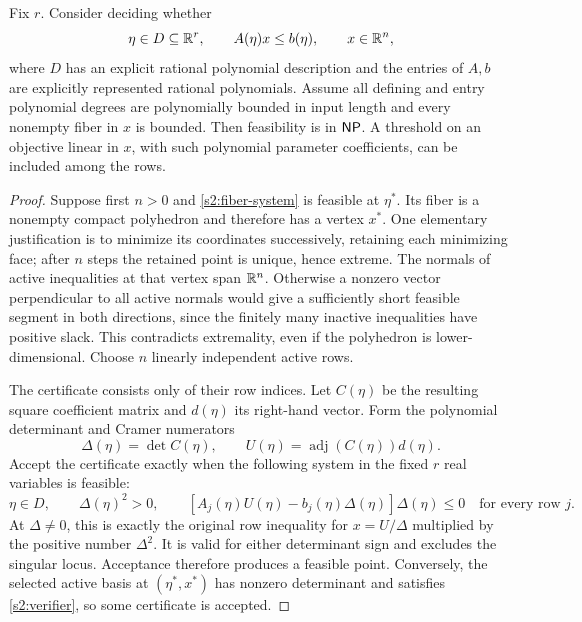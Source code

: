 \begin{theorem}\label{s2:fiber-np}
Fix $r$. Consider deciding whether
\begin{equation}
 \eta\in D\subseteq\mathbb R^r,\qquad A(\eta)x\le b(\eta),
 \qquad x\in\mathbb R^n,\label{s2:fiber-system}
\end{equation}
where $D$ has an explicit rational polynomial description and the
entries of $A,b$ are explicitly represented rational polynomials.
Assume all defining and entry polynomial degrees are polynomially bounded
in input length and
every nonempty fiber in $x$ is bounded. Then feasibility is in $\mathsf{NP}$.
A threshold on an objective linear in $x$, with such polynomial
parameter coefficients, can be included among the rows.
\end{theorem}
\begin{proof}
Suppose first $n>0$ and \eqref{s2:fiber-system} is feasible at
$\eta^*$. Its fiber is a nonempty compact polyhedron and therefore has
a vertex $x^*$. One elementary justification is to minimize its
coordinates successively, retaining each minimizing face; after $n$
steps the retained point is unique, hence extreme. The normals of
active inequalities at that vertex span $\mathbb R^n$. Otherwise a nonzero
vector perpendicular to all active normals would give a sufficiently
short feasible segment in both directions, since the finitely many
inactive inequalities have positive slack. This contradicts
extremality, even if the polyhedron is lower-dimensional. Choose $n$
linearly independent active rows.

The certificate consists only of their row indices. Let $C(\eta)$ be
the resulting square coefficient matrix and $d(\eta)$ its right-hand
vector. Form the polynomial determinant and Cramer numerators
\[
 \Delta(\eta)=\det C(\eta),\qquad
 U(\eta)=\operatorname{adj}(C(\eta))d(\eta).
\]
Accept the certificate exactly when the following system in the fixed
$r$ real variables is feasible:
\begin{equation}
 \eta\in D,\qquad \Delta(\eta)^2>0,\qquad
 [A_j(\eta)U(\eta)-b_j(\eta)\Delta(\eta)]\Delta(\eta)\le0
 \quad\text{for every row }j.\label{s2:verifier}
\end{equation}
At $\Delta\ne0$, this is exactly the original row inequality for
$x=U/\Delta$ multiplied by the positive number $\Delta^2$.
It is valid for either determinant sign and excludes the singular
locus. Acceptance therefore produces a feasible point. Conversely,
the selected active basis at $(\eta^*,x^*)$ has nonzero determinant
and satisfies \eqref{s2:verifier}, so some certificate is accepted.


\end{proof}
